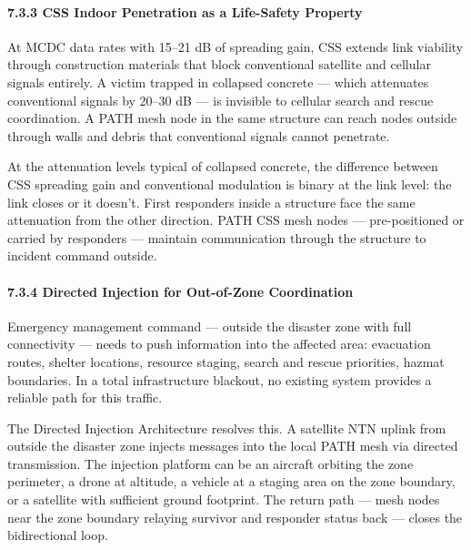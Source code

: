 \documentclass[
  11pt,
]{article}
\begin{document}
\hypertarget{css-indoor-penetration-as-a-life-safety-property}{%
\paragraph{7.3.3 CSS Indoor Penetration as a Life-Safety
Property}\label{css-indoor-penetration-as-a-life-safety-property}}

At MCDC data rates with 15--21 dB of spreading gain, CSS extends link
viability through construction materials that block conventional
satellite and cellular signals entirely. A victim trapped in collapsed
concrete --- which attenuates conventional signals by 20--30 dB --- is
invisible to cellular search and rescue coordination. A PATH mesh node
in the same structure can reach nodes outside through walls and debris
that conventional signals cannot penetrate.

At the attenuation levels typical of collapsed concrete, the difference
between CSS spreading gain and conventional modulation is binary at the
link level: the link closes or it doesn't. First responders inside a
structure face the same attenuation from the other direction. PATH CSS
mesh nodes --- pre-positioned or carried by responders --- maintain
communication through the structure to incident command outside.

\hypertarget{directed-injection-for-out-of-zone-coordination}{%
\paragraph{7.3.4 Directed Injection for Out-of-Zone
Coordination}\label{directed-injection-for-out-of-zone-coordination}}

Emergency management command --- outside the disaster zone with full
connectivity --- needs to push information into the affected area:
evacuation routes, shelter locations, resource staging, search and
rescue priorities, hazmat boundaries. In a total infrastructure
blackout, no existing system provides a reliable path for this traffic.

The Directed Injection Architecture resolves this. A satellite NTN
uplink from outside the disaster zone injects messages into the local
PATH mesh via directed transmission. The injection platform can be an
aircraft orbiting the zone perimeter, a drone at altitude, a vehicle at
a staging area on the zone boundary, or a satellite with sufficient
ground footprint. The return path --- mesh nodes near the zone boundary
relaying survivor and responder status back --- closes the bidirectional
loop.
\end{document}
